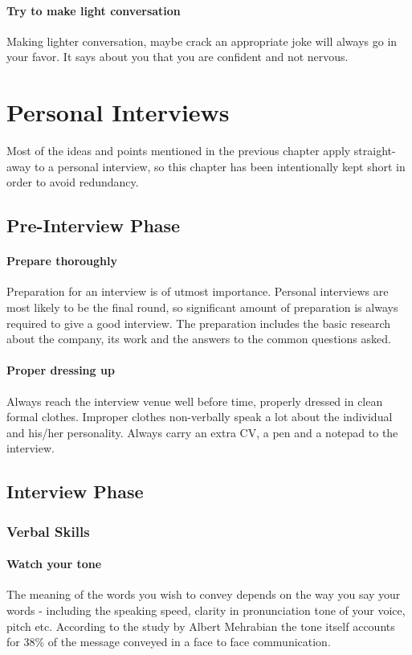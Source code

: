 \documentclass[a4paper,12pt]{report}
\begin{document}
\subsubsection{Try to make light conversation}
Making lighter conversation, maybe crack an appropriate joke will always go in your favor. It says about you
that you are confident and not nervous.

\chapter{Personal Interviews}
Most of the ideas and points mentioned in the previous chapter apply straight-away to a personal interview, so this chapter
has been intentionally kept short in order to avoid redundancy.

\section{Pre-Interview Phase}
\subsubsection{Prepare thoroughly}
Preparation for an interview is of utmost importance. Personal interviews are most likely to be the final round,
so significant amount of preparation is always required to give a good interview. The preparation includes the 
basic research about the company, its work and the answers to the common questions asked.
\subsubsection{Proper dressing up}
Always reach the interview venue well before time, properly dressed in clean formal clothes. Improper clothes
non-verbally speak a lot about the individual and his/her personality. Always carry an extra CV, a pen and 
a notepad to the interview.

\section{Interview Phase}

\subsection{Verbal Skills}
\subsubsection{Watch your tone}
The meaning of the words you wish to convey depends on the way you say your words - including the speaking
 speed, clarity in pronunciation tone of your voice, pitch etc. According to the study by Albert Mehrabian
\cite{mehrabian} the tone itself accounts for 38\% of the message conveyed in a face to face communication.
\end{document}
